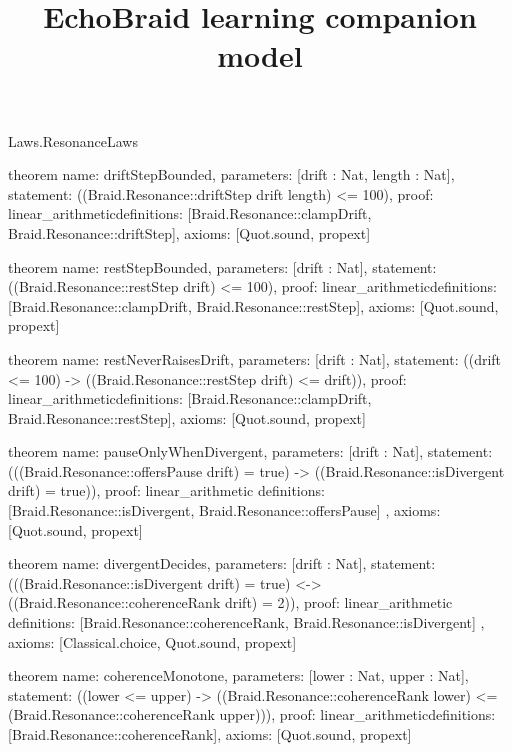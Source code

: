 \begin{lexlean}{Laws.ResonanceLaws}
\title{EchoBraid learning companion model}
\begin{semanticmodule}
theorem{
  name: driftStepBounded,
  parameters: [drift : Nat, length : Nat],
  statement: ((Braid.Resonance::driftStep drift length) <= 100),
  proof: linear_arithmetic{definitions: [Braid.Resonance::clampDrift, Braid.Resonance::driftStep]},
  axioms: [Quot.sound, propext]
}

theorem{
  name: restStepBounded,
  parameters: [drift : Nat],
  statement: ((Braid.Resonance::restStep drift) <= 100),
  proof: linear_arithmetic{definitions: [Braid.Resonance::clampDrift, Braid.Resonance::restStep]},
  axioms: [Quot.sound, propext]
}

theorem{
  name: restNeverRaisesDrift,
  parameters: [drift : Nat],
  statement: ((drift <= 100) -> ((Braid.Resonance::restStep drift) <= drift)),
  proof: linear_arithmetic{definitions: [Braid.Resonance::clampDrift, Braid.Resonance::restStep]},
  axioms: [Quot.sound, propext]
}

theorem{
  name: pauseOnlyWhenDivergent,
  parameters: [drift : Nat],
  statement: (((Braid.Resonance::offersPause drift) = true) -> ((Braid.Resonance::isDivergent drift) = true)),
  proof: linear_arithmetic{
    definitions: [Braid.Resonance::isDivergent, Braid.Resonance::offersPause]
  },
  axioms: [Quot.sound, propext]
}

theorem{
  name: divergentDecides,
  parameters: [drift : Nat],
  statement: (((Braid.Resonance::isDivergent drift) = true) <-> ((Braid.Resonance::coherenceRank drift) = 2)),
  proof: linear_arithmetic{
    definitions: [Braid.Resonance::coherenceRank, Braid.Resonance::isDivergent]
  },
  axioms: [Classical.choice, Quot.sound, propext]
}

theorem{
  name: coherenceMonotone,
  parameters: [lower : Nat, upper : Nat],
  statement: ((lower <= upper) -> ((Braid.Resonance::coherenceRank lower) <= (Braid.Resonance::coherenceRank upper))),
  proof: linear_arithmetic{definitions: [Braid.Resonance::coherenceRank]},
  axioms: [Quot.sound, propext]
}
\end{semanticmodule}
\end{lexlean}
